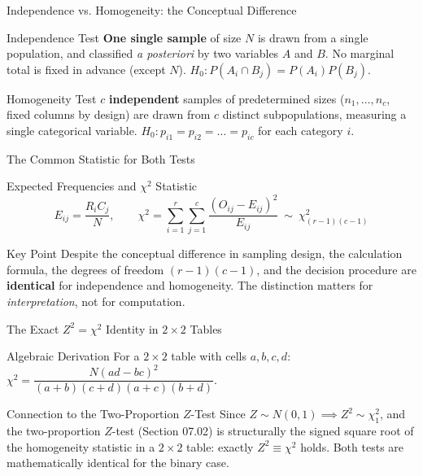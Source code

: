 \documentclass[10pt, aspectratio=169]{beamer}
\begin{document}
\begin{frame}{Independence vs. Homogeneity: the Conceptual Difference}
  \footnotesize
  \begin{block}{Independence Test}
    \textbf{One single sample} of size $N$ is drawn from a single population, and classified \emph{a posteriori} by two variables $A$ and $B$. No marginal total is fixed in advance (except $N$). $H_0: P(A_i\cap B_j)=P(A_i)P(B_j)$.
  \end{block}
  \pause

  \vspace{0.1cm}
  \begin{alertblock}{Homogeneity Test}
    $c$ \textbf{independent} samples of predetermined sizes ($n_1,\ldots,n_c$, fixed columns by design) are drawn from $c$ distinct subpopulations, measuring a single categorical variable. $H_0: p_{i1}=p_{i2}=\ldots=p_{ic}$ for each category $i$.
  \end{alertblock}
\end{frame}

\begin{frame}{The Common Statistic for Both Tests}
  \footnotesize
  \begin{block}{Expected Frequencies and $\chi^2$ Statistic}
    $$E_{ij} = \frac{R_i C_j}{N}, \qquad \chi^2 = \sum_{i=1}^r\sum_{j=1}^c \frac{(O_{ij}-E_{ij})^2}{E_{ij}} \ \sim\ \chi^2_{(r-1)(c-1)}$$
  \end{block}
  \pause

  \vspace{0.1cm}
  \begin{alertblock}{Key Point}
    Despite the conceptual difference in sampling design, the calculation formula, the degrees of freedom $(r-1)(c-1)$, and the decision procedure are \textbf{identical} for independence and homogeneity. The distinction matters for \emph{interpretation}, not for computation.
  \end{alertblock}
\end{frame}

\begin{frame}{The Exact $Z^2=\chi^2$ Identity in $2\times2$ Tables}
  \footnotesize
  \begin{block}{Algebraic Derivation}
    For a $2\times2$ table with cells $a,b,c,d$: $\chi^2 = \dfrac{N(ad-bc)^2}{(a+b)(c+d)(a+c)(b+d)}$.
  \end{block}
  \pause

  \vspace{0.1cm}
  \begin{alertblock}{Connection to the Two-Proportion $Z$-Test}
    Since $Z\sim N(0,1) \implies Z^2\sim\chi^2_1$, and the two-proportion $Z$-test (Section 07.02) is structurally the signed square root of the homogeneity statistic in a $2\times2$ table: exactly $Z^2\equiv\chi^2$ holds. Both tests are mathematically identical for the binary case.
  \end{alertblock}
\end{frame}
\end{document}
